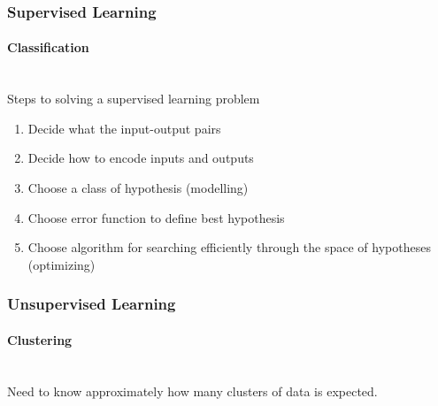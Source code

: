 \documentclass[a4paper]{article}
\begin{document}
\subsubsection{Supervised Learning}
\paragraph{Classification}\mbox{}\\
Steps to solving a supervised learning problem
\begin{enumerate}
	\item Decide what the input-output pairs
	\item Decide how to encode inputs and outputs
	\item Choose a class of hypothesis (modelling)
	\item Choose error function to define best hypothesis
	\item Choose algorithm for searching efficiently through the space of hypotheses (optimizing)
\end{enumerate}
\subsubsection{Unsupervised Learning}
\paragraph{Clustering}\mbox{}\\
Need to know approximately how many clusters of data is expected.
\end{document}
